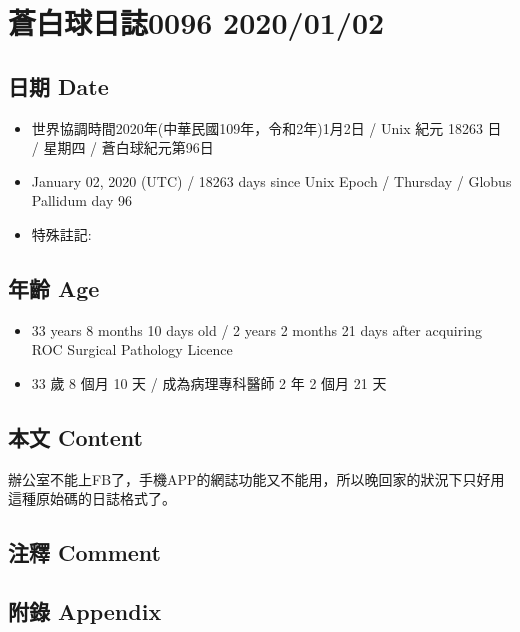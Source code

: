 \documentclass[
]{article}
\providecommand{\tightlist}{%
  \setlength{\itemsep}{0pt}\setlength{\parskip}{0pt}}
\begin{document}
\hypertarget{ux84bcux767dux7403ux65e5ux8a8c0096-20200102}{%
\section{蒼白球日誌0096
2020/01/02}\label{ux84bcux767dux7403ux65e5ux8a8c0096-20200102}}

\hypertarget{ux65e5ux671f-date-1}{%
\subsection{日期 Date}\label{ux65e5ux671f-date-1}}

\begin{itemize}
\tightlist
\item
  世界協調時間2020年(中華民國109年，令和2年)1月2日 / Unix 紀元 18263 日
  / 星期四 / 蒼白球紀元第96日
\item
  January 02, 2020 (UTC) / 18263 days since Unix Epoch / Thursday /
  Globus Pallidum day 96
\item
  特殊註記:
\end{itemize}

\hypertarget{ux5e74ux9f61-age-1}{%
\subsection{年齡 Age}\label{ux5e74ux9f61-age-1}}

\begin{itemize}
\tightlist
\item
  33 years 8 months 10 days old / 2 years 2 months 21 days after
  acquiring ROC Surgical Pathology Licence
\item
  33 歲 8 個月 10 天 / 成為病理專科醫師 2 年 2 個月 21 天
\end{itemize}

\hypertarget{ux672cux6587-content-1}{%
\subsection{本文 Content}\label{ux672cux6587-content-1}}

辦公室不能上FB了，手機APP的網誌功能又不能用，所以晚回家的狀況下只好用這種原始碼的日誌格式了。

\hypertarget{ux6ce8ux91cb-comment-1}{%
\subsection{注釋 Comment}\label{ux6ce8ux91cb-comment-1}}

\hypertarget{ux9644ux9304-appendix-1}{%
\subsection{附錄 Appendix}\label{ux9644ux9304-appendix-1}}
\end{document}
